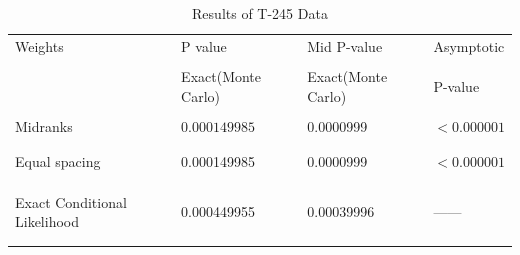 \documentclass[12pt,oneside]{report}
\theoremstyle{definition}
\theoremstyle{mystyle}
\begin{document}
\begin{table}[h!]
	\tiny
	\begin{center}
		\caption{Results of T-245 Data	}
		\begin{tabular}{ l l l l}
			\hline
			Weights & \hspace{5mm} P value& \hspace{5mm}Mid P-value&\hspace{5mm}Asymptotic  \\ 
			&\\
			& \hspace{5mm} Exact(Monte Carlo)& \hspace{5mm}Exact(Monte Carlo)&\hspace{5mm} P-value \\ \hline\hline
			&\\
			Midranks & \hspace{5mm}$0.000149985$ &\hspace{5mm} 0.0000999&\hspace{5mm}$<0.000001$\\ 
			& \hspace{5mm}&\hspace{5mm}\\ \hline
			&\\
			Equal spacing & \hspace{5mm}0.000149985  &\hspace{5mm}0.0000999&\hspace{5mm}$<0.000001$\\
			&\\ 
			
			
			&\\ \hline
			& \hspace{5mm} &\hspace{5mm} &\hspace{5mm}\\ 
			Exact Conditional Likelihood  & \hspace{5mm}0.000449955 &\hspace{5mm}0.00039996 &\hspace{5mm}------\\ 
			& \hspace{5mm}  &\hspace{5mm}\\\hline
			 
			& \hspace{5mm} &\hspace{5mm} &\hspace{5mm}\\ 
			
			\hline
		\end{tabular}
		\label{table:245tr}
	\end{center}
\end{table}
\end{document}
